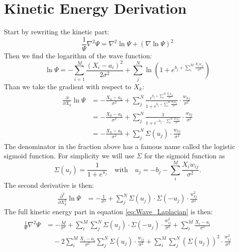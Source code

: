 \documentclass[12pt,a4paper,english]{article}
\begin{document}
\section{Kinetic Energy Derivation}
\label{appendix:E_k}
Start by rewriting the kinetic part:
\begin{equation}
\label{eq:Wave_Laplacian}
\frac{1}{\Psi}\nabla^2\Psi=\nabla^2\ln\Psi + (\nabla\ln\Psi)^2
\end{equation}
Then we find the logarithm of the wave function:
\begin{equation}
\ln\Psi=-\sum_{i=1}^{M}\frac{(X_i-a_i)^2}{2\sigma^2}+\sum_{j}^{N}\ln\left(1+e^{b_j + \sum_{i}^{M}\frac{X_iw_{ij}}{\sigma^2}}
\right)
\end{equation}
Than we take the gradient with respect to $X_k$:
\begin{align*}
\label{eq:Gradient_Xk}
\frac{\partial }{\partial X_k}\ln\Psi&=-\frac{X_k-a_k}{\sigma^2} + \sum_{j}^{N}\frac{e^{b_j + \sum_{i}^{M}\frac{X_iw_{ij}}{\sigma^2}}}{1+e^{b_j + \sum_{i}^{M}\frac{X_iw_{ij}}{\sigma^2}}}\cdot\frac{w_{kj}}{\sigma^2}\\ &=-\frac{X_k-a_k}{\sigma^2} + \sum_{j}^{N}\frac{1}{1+e^{-b_j - \sum_{i}^{M}\frac{X_iw_{ij}}{\sigma^2}}}\cdot\frac{w_{kj}}{\sigma^2}\\
&=-\frac{X_k-a_k}{\sigma^2} + \sum_{j}^{N}\Sigma(u_j)\cdot\frac{w_{kj}}{\sigma^2}
\end{align*}
The denominator in the fraction above has a famous name called the logistic sigmoid function. For simplicity we will use $\Sigma$ for the sigmoid function as
\begin{equation}
\label{eq:sigmoid}
\Sigma(u_j)=\frac{1}{1+e^{u_j}}\quad \text{with} \quad u_j=-b_j - \sum_{i}^{M}\frac{X_iw_{ij}}{\sigma^2}.
\end{equation}
The second derivative is then:
\begin{align*}
\frac{\partial^2 }{\partial X_k^2}\ln\Psi&=-\frac{1}{\sigma^2}+\sum_{j}^{N}\Sigma(u_j)\cdot\Sigma(-u_j)\cdot\frac{w_{kj}^2}{\sigma^4}
\end{align*}
The full kinetic energy part in equation \ref{eq:Wave_Laplacian} is then:
\begin{align*}
\frac{1}{\Psi}\nabla^2\Psi&= -\frac{M}{\sigma^2} +\sum_{i}^{M}\sum_{j}^{N}\Sigma(u_j)\cdot\Sigma(-u_j)\cdot\frac{w_{ij}^2}{\sigma^4} +\sum_{i}^{M}\frac{X_i-a_i}{\sigma^2}\\ 
&\quad -2\sum_{i}^{M}\frac{X_i-a_i}{\sigma^2}\sum_{j}^{N}\Sigma(u_j)\cdot\frac{w_{ij}}{\sigma^2} 
+\sum_{i}^{M}\sum_{j}^{N}(\Sigma(u_j))^2\cdot\frac{w_{ij}^2}{\sigma^4}
\end{align*}
\end{document}
